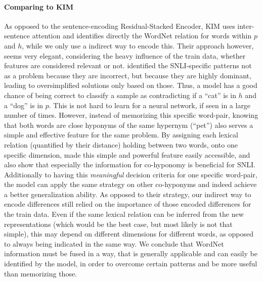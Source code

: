 \paragraph*{Comparing to \ac{KIM}}
As opposed to the sentence-encoding Residual-Stacked Encoder, \ac{KIM} \citep{chen-EtAl:2017b:natural} uses inter-sentence attention and identifies directly the WordNet relation for words within $p$ and $h$, while we only use a indirect way to encode this. Their approach however, seems very elegant, considering the heavy influence of the train data, whether features are considered relevant or not. \cite{gururangan2018annotation} identified the \ac{SNLI}-specific patterns not as a problem because they are incorrect, but because they are highly dominant, leading to oversimplified solutions only based on those. Thus, a model has a good chance of being correct to classify a sample as contradicting if a ``cat'' is in $h$ and a ``dog'' is in $p$. This is not hard to learn for a neural network, if seen in a large number of times. However, instead of memorizing this specific word-pair, knowing that both words are close hyponyms of the same hypernym (``pet'') also serves a simple and effective feature for the same problem. By assigning each lexical relation (quantified by their distance) holding between two words, onto one specific dimension, \cite{chen-EtAl:2017b:natural} made this simple and powerful feature easily accessible, and also show that especially the information for co-hyponomy is beneficial for \ac{SNLI}. Additionally to having this \textit{meaningful} decision criteria for one specific word-pair, the model can apply the same strategy on other co-hyponyms and indeed achieve a better generalization ability. As opposed to their strategy, our indirect way to encode differences still relied on the importance of those encoded differences for the train data. Even if the same lexical relation can be inferred from the new representations (which would be the best case, but most likely is not that simple), this may depend on different dimensions for different words, as opposed to always being indicated in the same way. We conclude that WordNet information must be fused in a way, that is generally applicable and can easily be identified by the model, in order to overcome certain patterns and be more useful than memorizing those.